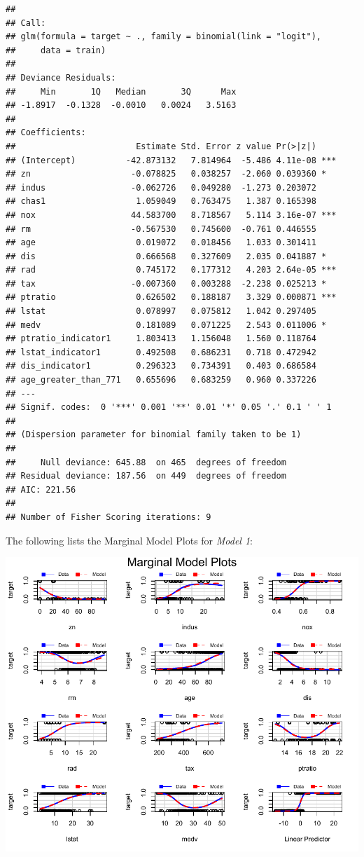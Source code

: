 \documentclass[3p]{elsarticle} %
\begin{document}
\begin{verbatim}
## 
## Call:
## glm(formula = target ~ ., family = binomial(link = "logit"), 
##     data = train)
## 
## Deviance Residuals: 
##     Min       1Q   Median       3Q      Max  
## -1.8917  -0.1328  -0.0010   0.0024   3.5163  
## 
## Coefficients:
##                        Estimate Std. Error z value Pr(>|z|)    
## (Intercept)          -42.873132   7.814964  -5.486 4.11e-08 ***
## zn                    -0.078825   0.038257  -2.060 0.039360 *  
## indus                 -0.062726   0.049280  -1.273 0.203072    
## chas1                  1.059049   0.763475   1.387 0.165398    
## nox                   44.583700   8.718567   5.114 3.16e-07 ***
## rm                    -0.567530   0.745600  -0.761 0.446555    
## age                    0.019072   0.018456   1.033 0.301411    
## dis                    0.666568   0.327609   2.035 0.041887 *  
## rad                    0.745172   0.177312   4.203 2.64e-05 ***
## tax                   -0.007360   0.003288  -2.238 0.025213 *  
## ptratio                0.626502   0.188187   3.329 0.000871 ***
## lstat                  0.078997   0.075812   1.042 0.297405    
## medv                   0.181089   0.071225   2.543 0.011006 *  
## ptratio_indicator1     1.803413   1.156048   1.560 0.118764    
## lstat_indicator1       0.492508   0.686231   0.718 0.472942    
## dis_indicator1         0.296323   0.734391   0.403 0.686584    
## age_greater_than_771   0.655696   0.683259   0.960 0.337226    
## ---
## Signif. codes:  0 '***' 0.001 '**' 0.01 '*' 0.05 '.' 0.1 ' ' 1
## 
## (Dispersion parameter for binomial family taken to be 1)
## 
##     Null deviance: 645.88  on 465  degrees of freedom
## Residual deviance: 187.56  on 449  degrees of freedom
## AIC: 221.56
## 
## Number of Fisher Scoring iterations: 9
\end{verbatim}

The following lists the Marginal Model Plots for \emph{Model 1}:

\includegraphics{paper_files/figure-latex/unnamed-chunk-13-1.pdf}
\end{document}
